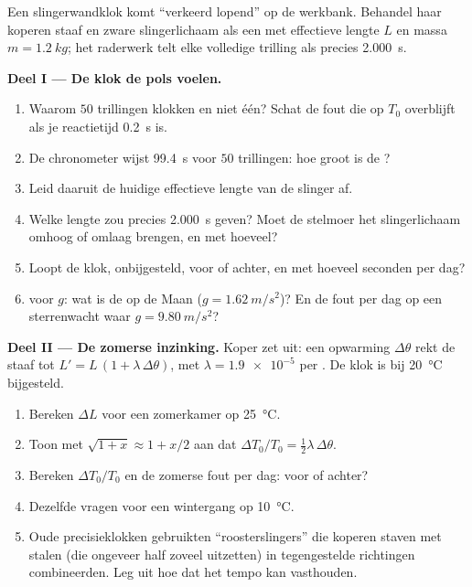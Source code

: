 \begin{problem}
\label{pb:g12:oscillators-and-time:1}
Een slingerwandklok komt ``verkeerd lopend'' op de werkbank. Behandel haar
koperen staaf en zware slingerlichaam als een  met
effectieve lengte $L$ en massa $m = \qty{1.2}{kg}$; het raderwerk telt elke
volledige trilling als precies \qty{2.000}{s}.

\medskip
\noindent\textbf{Deel I --- De klok de pols voelen.}
\begin{enumerate}
  \item Waarom $50$ trillingen klokken en niet één? Schat de fout die op $T_0$
        overblijft als je reactietijd \qty{0.2}{s} is.
  \item De chronometer wijst \qty{99.4}{s} voor $50$ trillingen: hoe groot is
        de ?
  \item Leid daaruit de huidige effectieve lengte van de slinger af.
  \item Welke lengte zou precies \qty{2.000}{s} geven? Moet de stelmoer het
        slingerlichaam omhoog of omlaag brengen, en met hoeveel?
  \item Loopt de klok, onbijgesteld, voor of achter, en met hoeveel seconden
        per dag?
  \item {} voor $g$: wat is de  op de Maan
        ($g = \qty{1.62}{m/s^2}$)? En de fout per dag op een sterrenwacht waar
        $g = \qty{9.80}{m/s^2}$?
\end{enumerate}

\medskip
\noindent\textbf{Deel II --- De zomerse inzinking.} Koper zet uit: een
opwarming $\Delta\theta$ rekt de staaf tot $L' = L\,(1 + \lambda\,
\Delta\theta)$, met $\lambda = \num{1.9e-5}$ per . De klok is bij
\qty{20}{\celsius} bijgesteld.
\begin{enumerate}[resume]
  \item Bereken $\Delta L$ voor een zomerkamer op \qty{25}{\celsius}.
  \item Toon met $\sqrt{1+x} \approx 1 + x/2$ aan dat
        $\Delta T_0 / T_0 = \tfrac12 \lambda\, \Delta\theta$.
  \item Bereken $\Delta T_0/T_0$ en de zomerse fout per dag: voor of achter?
  \item Dezelfde vragen voor een wintergang op \qty{10}{\celsius}.
  \item Oude precisieklokken gebruikten ``roosterslingers'' die koperen staven
        met stalen (die ongeveer half zoveel uitzetten) in tegengestelde
        richtingen combineerden. Leg uit hoe dat het tempo kan vasthouden.
\end{enumerate}


\end{problem}
